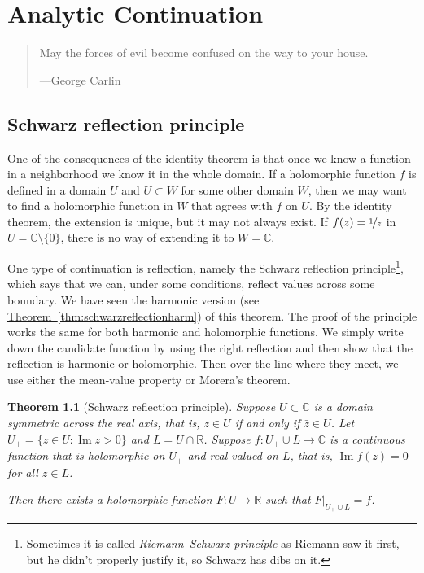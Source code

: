 \documentclass[12pt,openany]{book}
\renewcommand{\Im}{\operatorname{Im}}
\newcommand{\C}{{\mathbb{C}}}
\newcommand{\R}{{\mathbb{R}}}
\newcommand{\myindex}[1]{#1\index{#1}}
\theoremstyle{plain}
\newtheorem{thm}{Theorem}[section]
\theoremstyle{remark}
\theoremstyle{definition}
\newenvironment{myepigraph}{%
    \begin{quote}%
    \begingroup\itshape
}{%
    \endgroup%
    \end{quote}
}
\theoremstyle{exercise}
\theoremstyle{example}
\newcommand{\thmref}[1]{\hyperref[#1]{Theorem~\ref*{#1}}}
\begin{document}

\chapter{Analytic Continuation} \label{ch:analcont}

\begin{myepigraph}
May the forces of evil become confused on the way to your house.

---George Carlin
\end{myepigraph}


\section{Schwarz reflection principle}

One of the consequences of the identity theorem is that once we know a
function in a neighborhood we know it in the whole domain.
If a holomorphic function $f$ is defined in a
domain $U$ and $U \subset W$ for some other domain $W$,
then we may want to find a holomorphic function in $W$ that agrees with
$f$ on $U$.  By the identity theorem, the extension is unique, but it may not
always exist.  If $f(z) =
\nicefrac{1}{z}$ in $U = \C \setminus \{ 0 \}$, there is no way
of extending it to $W = \C$.

One type of continuation is reflection, namely the Schwarz reflection
principle\footnote{Sometimes it is called
\emph{\myindex{Riemann--Schwarz principle}} as Riemann saw it first, but he 
didn't properly justify it, so Schwarz has dibs on it.},
which 
says that we can, under some conditions, reflect values across some boundary.
We have seen the harmonic version (see \thmref{thm:schwarzreflectionharm})
of this theorem.
The proof of the principle works the same for both
harmonic and holomorphic functions.
We simply write down the candidate function by using
the right reflection and then show that the reflection is harmonic or
holomorphic.  Then over the line where they meet, we use either the
mean-value property or Morera's theorem.

\begin{thm}[Schwarz reflection principle]
\label{thm:schwarzreflectionholo}
Suppose $U \subset \C$ is a domain symmetric across the real axis, that is,
$z \in U$ if and only if $\bar{z} \in U$.
Let $U_+ = \{ z \in U : \Im z > 0 \}$ and $L = U \cap \R$.
Suppose $f \colon U_+ \cup L \to \C$ is a continuous function that is
holomorphic on $U_+$ and real-valued on $L$, that is,
$\Im f(z) = 0$ for all $z \in L$.

Then there exists a holomorphic function $F \colon U \to \R$ such that
$F|_{U_+ \cup L} = f$.
\end{thm}
\end{document}
